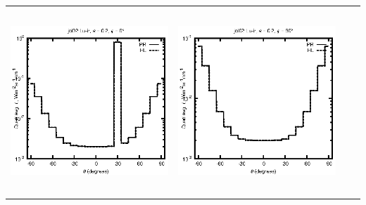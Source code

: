 \begin{tabular}{c c c c}
\includegraphics[height=7cm]{../eps/jol02_Lu_ir_fwd.eps} &
\includegraphics[height=7cm]{../eps/jol02_Lu_ir_cross.eps} \\
\end{tabular}

\pagebreak

